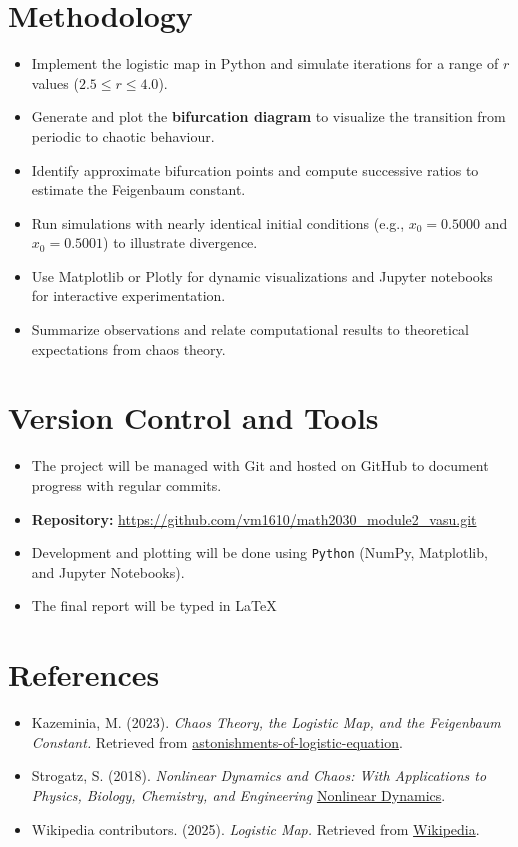 \documentclass[12pt]{article}
\begin{document}
\section{Methodology}

\begin{itemize}
    \item Implement the logistic map in Python and simulate iterations for a range of \(r\) values (\(2.5 \leq r \leq 4.0\)).
    \item Generate and plot the \textbf{bifurcation diagram} to visualize the transition from periodic to chaotic behaviour.
    \item Identify approximate bifurcation points and compute successive ratios to estimate the Feigenbaum constant.
    \item Run simulations with nearly identical initial conditions (e.g., \(x_0 = 0.5000\) and \(x_0 = 0.5001\)) to illustrate divergence.
    \item Use Matplotlib or Plotly for dynamic visualizations and Jupyter notebooks for interactive experimentation.
    \item Summarize observations and relate computational results to theoretical expectations from chaos theory.
\end{itemize}
\section{Version Control and Tools}

\begin{itemize}
    \item The project will be managed with Git and hosted on GitHub to document progress with regular commits.
    \item \textbf{Repository:} \url{https://github.com/vm1610/math2030_module2_vasu.git}

    \item Development and plotting will be done using \texttt{Python} (NumPy, Matplotlib, and Jupyter Notebooks).
    \item The final report will be typed in \LaTeX{} 
\end{itemize}

\section{References}
\begin{itemize}


    \item Kazeminia, M. (2023). \textit{Chaos Theory, the Logistic Map, and the Feigenbaum Constant.} Retrieved from \href{https://mehrankazeminia.medium.com/astonishments-of-logistic-equation-feigenbaum-constant-c725b0866d80}{astonishments-of-logistic-equation}.
    \item Strogatz, S. (2018). \textit{Nonlinear Dynamics and Chaos: With Applications to Physics, Biology, Chemistry, and Engineering} \href{https://www.biodyn.ro/course/literatura/Nonlinear_Dynamics_and_Chaos_2018_Steven_H._Strogatz.pdf} {Nonlinear Dynamics}.
    \item Wikipedia contributors. (2025). \textit{Logistic Map.} Retrieved from \href{https://en.wikipedia.org/wiki/Logistic_map}{Wikipedia}.
\end{itemize}
\end{document}
